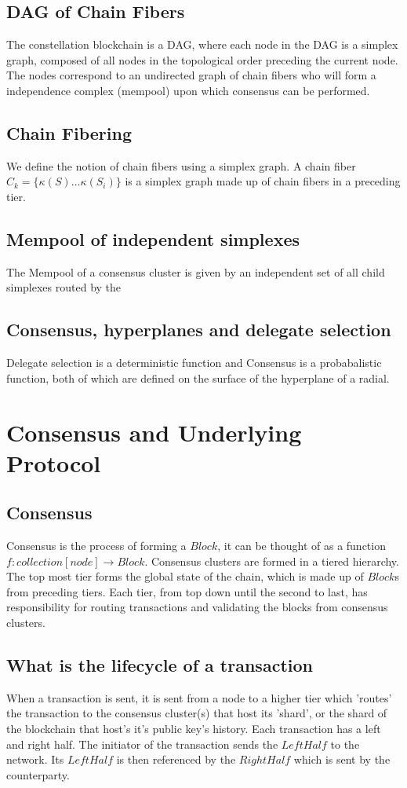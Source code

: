 \documentclass{article}
\begin{document}
\subsection{DAG of Chain Fibers}
The constellation blockchain is a DAG, where each node in the DAG is a simplex graph, composed of all nodes in the topological order preceding the current node. The nodes correspond to an undirected graph of chain fibers who will form a independence complex (mempool) upon which consensus can be performed.

\subsection{Chain Fibering}
We define the notion of chain fibers using a simplex graph. A chain fiber $C_k = \{\kappa(S) \dots \kappa(S_i) \}$ is a simplex graph made up of chain fibers in a preceding tier.

\subsection{Mempool of independent simplexes}
The Mempool of a consensus cluster is given by an independent set of all child simplexes routed by the

\subsection{Consensus, hyperplanes and delegate selection}
Delegate selection is a deterministic function and Consensus is a probabalistic function, both of which are defined on the surface of the hyperplane of a radial.


\section{Consensus and Underlying Protocol}
\subsection{Consensus}
Consensus is the process of forming a $Block$, it can be thought of as a function $f: collection[node] \rightarrow Block$. Consensus clusters are formed in a tiered hierarchy. The top most tier forms the global state of the chain, which is made up of $Block$s from preceding tiers. Each tier, from top down until the second to last, has responsibility for routing transactions and validating the blocks from consensus clusters. 

\subsection{What is the lifecycle of a transaction}
When a transaction is sent, it is sent from a node to a higher tier which 'routes' the transaction to the consensus cluster(s) that host its 'shard', or the shard of the blockchain that host's it's public key's history. Each transaction has a left and right half. The initiator of the transaction sends the $LeftHalf$ to the network. Its $LeftHalf$ is then referenced by the $RightHalf$ which is sent by the counterparty.
\end{document}
